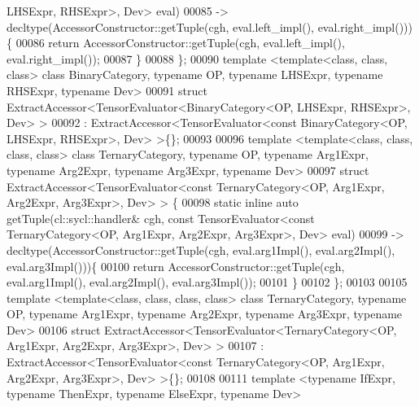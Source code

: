 \begin{DoxyCode}
       LHSExpr, RHSExpr>, Dev> eval)
00085   -> decltype(AccessorConstructor::getTuple(cgh, eval.left\_impl(), eval.right\_impl()))\{
00086     \textcolor{keywordflow}{return} AccessorConstructor::getTuple(cgh, eval.left\_impl(), eval.right\_impl());
00087   \}
00088 \};
00090 \textcolor{keyword}{template} <\textcolor{keyword}{template}<\textcolor{keyword}{class}, \textcolor{keyword}{class}, \textcolor{keyword}{class}> \textcolor{keyword}{class }BinaryCategory, \textcolor{keyword}{typename} OP,  \textcolor{keyword}{typename} LHSExpr, \textcolor{keyword}{typename} 
      RHSExpr, \textcolor{keyword}{typename} Dev>
00091 \textcolor{keyword}{struct }ExtractAccessor<TensorEvaluator<BinaryCategory<OP, LHSExpr, RHSExpr>, Dev> >
00092 : ExtractAccessor<TensorEvaluator<const BinaryCategory<OP, LHSExpr, RHSExpr>, Dev> >\{\};
00093 
00096 \textcolor{keyword}{template} <\textcolor{keyword}{template}<\textcolor{keyword}{class}, \textcolor{keyword}{class}, \textcolor{keyword}{class}, \textcolor{keyword}{class}> \textcolor{keyword}{class }TernaryCategory, \textcolor{keyword}{typename} OP, \textcolor{keyword}{typename} Arg1Expr, \textcolor{keyword}{
      typename} Arg2Expr, \textcolor{keyword}{typename} Arg3Expr, \textcolor{keyword}{typename} Dev>
00097 \textcolor{keyword}{struct }ExtractAccessor<TensorEvaluator<const TernaryCategory<OP, Arg1Expr, Arg2Expr, Arg3Expr>, Dev> > \{
00098   \textcolor{keyword}{static} \textcolor{keyword}{inline} \textcolor{keyword}{auto} getTuple(cl::sycl::handler& cgh, \textcolor{keyword}{const} TensorEvaluator<\textcolor{keyword}{const} TernaryCategory<OP,
       Arg1Expr, Arg2Expr, Arg3Expr>, Dev> eval)
00099   -> decltype(AccessorConstructor::getTuple(cgh, eval.arg1Impl(), eval.arg2Impl(), eval.arg3Impl()))\{
00100     \textcolor{keywordflow}{return} AccessorConstructor::getTuple(cgh, eval.arg1Impl(), eval.arg2Impl(), eval.arg3Impl());
00101   \}
00102 \};
00103 
00105 \textcolor{keyword}{template} <\textcolor{keyword}{template}<\textcolor{keyword}{class}, \textcolor{keyword}{class}, \textcolor{keyword}{class}, \textcolor{keyword}{class}> \textcolor{keyword}{class }TernaryCategory, \textcolor{keyword}{typename} OP, \textcolor{keyword}{typename} Arg1Expr, \textcolor{keyword}{
      typename} Arg2Expr, \textcolor{keyword}{typename} Arg3Expr, \textcolor{keyword}{typename} Dev>
00106 \textcolor{keyword}{struct }ExtractAccessor<TensorEvaluator<TernaryCategory<OP, Arg1Expr, Arg2Expr, Arg3Expr>, Dev> >
00107 : ExtractAccessor<TensorEvaluator<const TernaryCategory<OP, Arg1Expr, Arg2Expr, Arg3Expr>, Dev> >\{\};
00108 
00111 \textcolor{keyword}{template} <\textcolor{keyword}{typename} IfExpr, \textcolor{keyword}{typename} ThenExpr, \textcolor{keyword}{typename} ElseExpr, \textcolor{keyword}{typename} Dev>

\end{DoxyCode}
